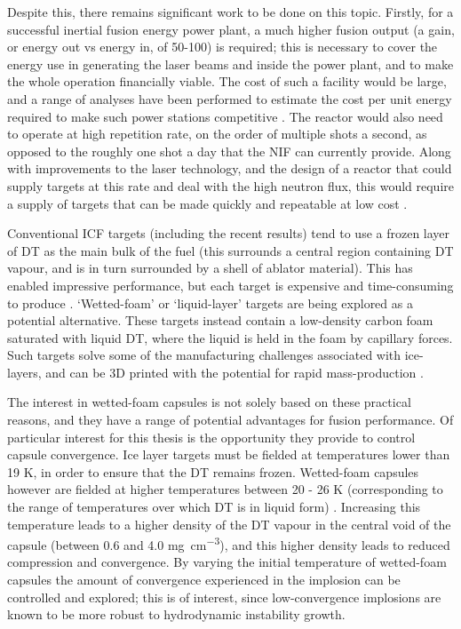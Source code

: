 Despite this, there remains significant work to be done on this topic. Firstly, for a successful inertial fusion energy power plant, a much higher fusion output (a gain, or energy out vs energy in, of 50-100) is required; this is necessary to cover the energy use in generating the laser beams and inside the power plant, and to make the whole operation financially viable. The cost of such a facility would be large, and a range of analyses have been performed to estimate the cost per unit energy required to make such power stations competitive \cite{Tynan2020, Gi2020}. The reactor would also need to operate at high repetition rate, on the order of multiple shots a second, as opposed to the roughly one shot a day that the NIF can currently provide. Along with improvements to the laser technology, and the design of a reactor that could supply targets at this rate and deal with the high neutron flux, this would require a supply of targets that can be made quickly and repeatable at low cost \cite{Nuckolls2010}.

Conventional ICF targets (including the recent results) tend to use a frozen layer of DT as the main bulk of the fuel (this surrounds a central region containing DT vapour, and is in turn surrounded by a shell of ablator material). This has enabled impressive performance, but each target is expensive and time-consuming to produce \cite{Goncharov2020}. `Wetted-foam' or `liquid-layer' targets are being explored as a potential alternative. These targets instead contain a low-density carbon foam saturated with liquid DT, where the liquid is held in the foam by capillary forces. Such targets solve some of the manufacturing challenges associated with ice-layers, and can be 3D printed with the potential for rapid mass-production \cite{Olson2021}.

The interest in wetted-foam capsules is not solely based on these practical reasons, and they have a range of potential advantages for fusion performance. Of particular interest for this thesis is the opportunity they provide to control capsule convergence. Ice layer targets must be fielded at temperatures lower than 19 K, in order to ensure that the DT remains frozen. Wetted-foam capsules however are fielded at higher temperatures between 20 - 26 K (corresponding to the range of temperatures over which DT is in liquid form) \cite{Olson2016}. Increasing this temperature leads to a higher density of the DT vapour in the central void of the capsule (between 0.6 and 4.0 \unit{\milli\gram\per\centi\meter\cubed}), and this higher density leads to reduced compression and convergence. By varying the initial temperature of wetted-foam capsules the amount of convergence experienced in the implosion can be controlled and explored; this is of interest, since low-convergence implosions are known to be more robust to hydrodynamic instability growth.

